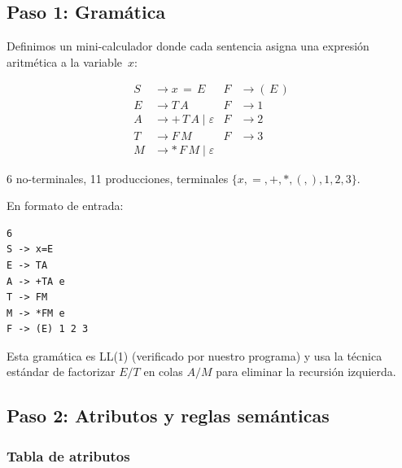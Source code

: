 \documentclass[11pt,a4paper]{article}
\begin{document}
\subsection{Paso 1: Gram\'atica}

Definimos un mini-calculador donde cada sentencia asigna una expresi\'on aritm\'etica a la variable~$x$:

\begin{align*}
S &\to x\,{=}\,E        & F &\to (\,E\,) \\
E &\to T\,A             & F &\to 1 \\
A &\to {+}\,T\,A \mid \varepsilon  & F &\to 2 \\
T &\to F\,M             & F &\to 3 \\
M &\to {*}\,F\,M \mid \varepsilon  &   &
\end{align*}

6 no-terminales, 11 producciones, terminales $\{x, =, +, *, (, ), 1, 2, 3\}$.

En formato de entrada:
\begin{lstlisting}
6
S -> x=E
E -> TA
A -> +TA e
T -> FM
M -> *FM e
F -> (E) 1 2 3
\end{lstlisting}

Esta gram\'atica es LL(1) (verificado por nuestro programa) y usa la t\'ecnica est\'andar de factorizar $E/T$ en colas $A/M$ para eliminar la recursi\'on izquierda.

\subsection{Paso 2: Atributos y reglas sem\'anticas}

\subsubsection*{Tabla de atributos}
\end{document}
